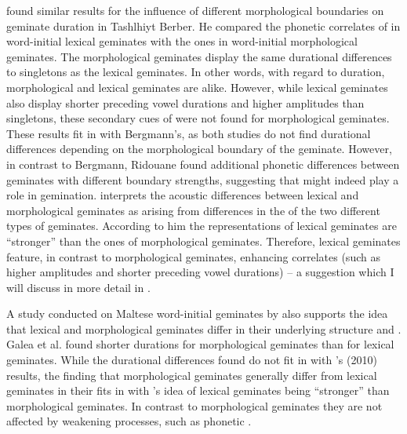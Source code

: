 \cite{Ridouane.2010} found similar results for the influence of different morphological boundaries on geminate duration in Tashlhiyt Berber. He compared the phonetic correlates of  in word-initial  lexical geminates with the ones in word-initial  morphological geminates. The  morphological geminates display the same durational differences to singletons as the  lexical geminates. In other words, with regard to duration, morphological and  lexical geminates are alike. However, while  lexical geminates also display shorter preceding vowel durations and higher amplitudes than singletons, these secondary cues of  were not found for  morphological geminates. These results fit in with Bergmann's, as both studies do not find durational differences depending on the morphological boundary of the geminate. However, in contrast to Bergmann, Ridouane found additional phonetic differences between geminates with different {boundary strengths}, suggesting that  might indeed play a role in {gemination}. 
\cite{Ridouane.2010} interprets the acoustic differences between lexical and  morphological geminates as arising from differences in the  of the two different types of geminates.  According to him the representations of  lexical geminates are ``stronger'' than the ones of  morphological geminates. Therefore,  lexical geminates feature, in contrast to  morphological geminates, enhancing correlates (such as higher amplitudes and shorter preceding vowel durations)  -- a suggestion which I will discuss in more detail in . 

A study conducted on Maltese word-initial geminates by \cite{Galea.2014} also supports the idea that lexical and  morphological geminates differ in their underlying structure and . Galea et al. found shorter durations for  morphological geminates than for  lexical geminates. While the durational differences found do not fit in with \citeauthor{Ridouane.2010}'s (2010) results, the finding that  morphological geminates generally differ from  lexical geminates in their  fits in with \citeauthor{Ridouane.2010}'s idea of  lexical geminates being ``stronger'' than  morphological geminates. In contrast to  morphological geminates they are not affected by weakening processes, such as phonetic . 

